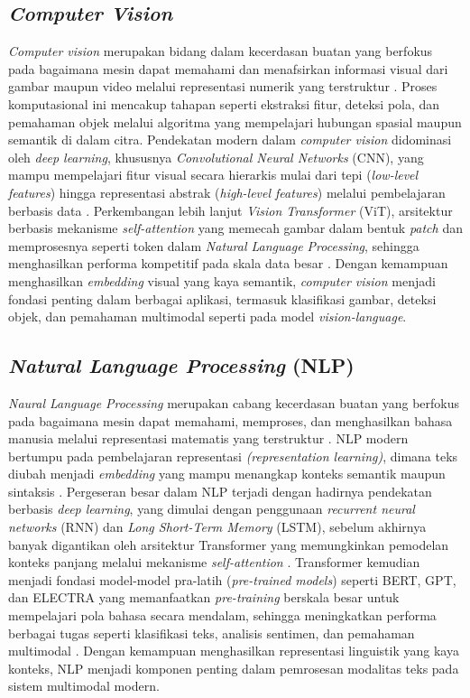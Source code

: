 \subsection{\textit{Computer Vision}} \label{II.teori2}
\textit{Computer vision} merupakan bidang dalam kecerdasan buatan yang berfokus pada bagaimana mesin dapat memahami dan menafsirkan informasi visual dari gambar maupun video melalui representasi numerik yang terstruktur \cite{sciencedirect_computer_vision_overview}. Proses komputasional ini mencakup tahapan seperti ekstraksi fitur, deteksi pola, dan pemahaman objek melalui algoritma yang mempelajari hubungan spasial maupun semantik di dalam citra. Pendekatan modern dalam \textit{computer vision} didominasi oleh \textit{deep learning}, khususnya \textit{Convolutional Neural Networks} (CNN), yang mampu mempelajari fitur visual secara hierarkis mulai dari tepi (\textit{low-level features}) hingga representasi abstrak (\textit{high-level features}) melalui pembelajaran berbasis data \cite{lecun2015deep}. Perkembangan lebih lanjut \textit{Vision Transformer} (ViT), arsitektur berbasis mekanisme \textit{self-attention} yang memecah gambar dalam bentuk \textit{patch} dan memprosesnya seperti token dalam \textit{Natural Language Processing}, sehingga menghasilkan performa kompetitif pada skala data besar \cite{dosovitskiy2020image}. Dengan kemampuan menghasilkan \textit{embedding} visual yang kaya semantik, \textit{computer vision}  menjadi fondasi penting dalam berbagai aplikasi, termasuk klasifikasi gambar, deteksi objek, dan pemahaman multimodal seperti pada model \textit{vision-language}.

\subsection{\textit{Natural Language Processing} (NLP)} \label{II.teori3}
\textit{Naural Language Processing} merupakan cabang kecerdasan buatan yang berfokus pada bagaimana mesin dapat memahami, memproses, dan menghasilkan bahasa manusia melalui representasi matematis yang terstruktur \cite{jurafsky2026slp}. NLP modern bertumpu pada pembelajaran representasi \textit{(representation learning)}, dimana teks diubah menjadi \textit{embedding} yang mampu menangkap konteks semantik maupun sintaksis \cite{liu2018neural}. Pergeseran besar dalam NLP terjadi dengan hadirnya pendekatan berbasis \textit{deep learning}, yang dimulai dengan penggunaan \textit{recurrent neural networks} (RNN) dan \textit{Long Short-Term Memory} (LSTM), sebelum akhirnya banyak digantikan oleh arsitektur Transformer yang memungkinkan pemodelan konteks panjang melalui mekanisme \textit{self-attention} \cite{young2017recent}. Transformer kemudian menjadi fondasi model-model pra-latih (\textit{pre-trained models}) seperti BERT, GPT, dan ELECTRA yang memanfaatkan \textit{pre-training} berskala besar untuk mempelajari pola bahasa secara mendalam, sehingga meningkatkan performa berbagai tugas seperti klasifikasi teks, analisis sentimen, dan pemahaman multimodal \cite{devlin2018bert}. Dengan kemampuan menghasilkan representasi linguistik yang kaya konteks, NLP menjadi komponen penting dalam pemrosesan modalitas teks pada sistem multimodal modern. \par


